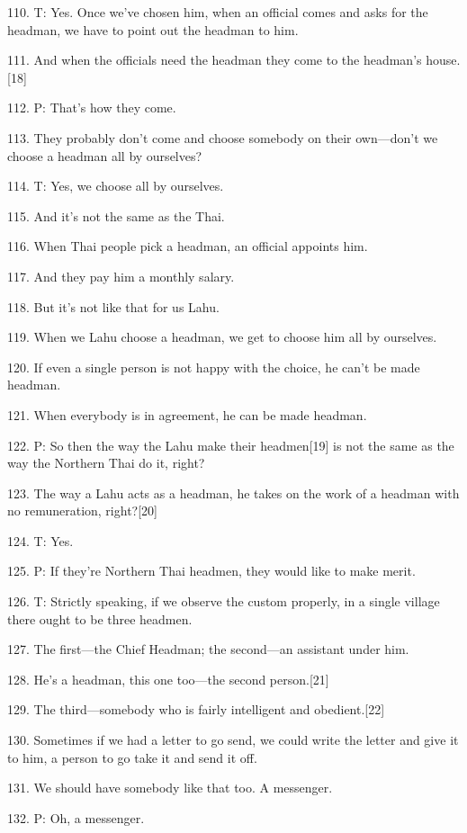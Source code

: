 {110. T: Yes. Once we've chosen him, when an official comes and asks for
the headman, we have to point out the headman to him.}

{111. And when the officials need the headman they come to the headman's
house.[18]}

{112. P: That's how they come.}

{113. They probably don't come and choose somebody on their own---don't
we choose a headman all by ourselves?}

{114. T: Yes, we choose all by ourselves.}

{115. And it's not the same as the Thai.}

{116. When Thai people pick a headman, an official appoints him.}

{117. And they pay him a monthly salary.}

{118. But it's not like that for us Lahu.}

{119. When we Lahu choose a headman, we get to choose him all by ourselves.}

{120. If even a single person is not happy with the choice, he can't be
made headman.}

{121. When everybody is in agreement, he can be made headman.}

{122. P: So then the way the Lahu make their headmen[19] is not the same
as the way the Northern Thai do it, right?}

{123. The way a Lahu acts as a headman, he takes on the work of a headman
with no remuneration, right?[20]}

{124. T: Yes.}

{125. P: If they're Northern Thai headmen, they would like to make merit.}

{126. T: Strictly speaking, if we observe the custom properly, in a single
village there ought to be three headmen.}

{127. The first---the Chief Headman; the second---an assistant under him.}

{128. He's a headman, this one too---the second person.[21]}

{129. The third---somebody who is fairly intelligent and obedient.[22]}

{130. Sometimes if we had a letter to go send, we could write the letter
and give it to him, a person to go take it and send it off.}

{131. We should have somebody like that too. A messenger.}

{132. P: Oh, a messenger.}

